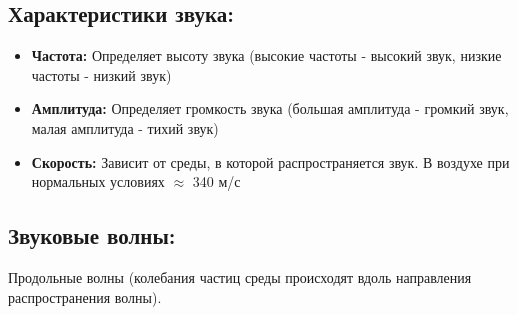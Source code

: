 \documentclass[a4paper,12pt]{article}
\begin{document}
\vspace{-9pt}
\subsection*{Характеристики звука:}
\vspace{-3pt}
\begin{itemize}[itemsep=0pt, topsep=0pt, parsep=0pt]
    \item \textbf{Частота:} Определяет высоту звука (высокие частоты - высокий звук, низкие частоты - низкий звук)
    \item \textbf{Амплитуда:} Определяет громкость звука (большая амплитуда - громкий звук, малая амплитуда - тихий звук)
    \item \textbf{Скорость:} Зависит от среды, в которой распространяется звук. В воздухе при нормальных условиях $\approx$ 340 м/с
\end{itemize}

\vspace{-9pt}
\subsection*{Звуковые волны:}
\vspace{-3pt}
Продольные волны (колебания частиц среды происходят вдоль направления распространения волны).
\end{document}
